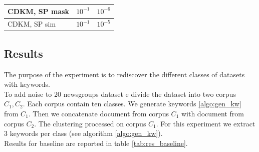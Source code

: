 \begin{table}
{\begin{tabular}{|l|l|l|}
       CDKM, SP mask  &$10^{-1}$  &$10^{-6}$         \\ \hline
       CDKM, SP sim   &$10^{-1}$  &$10^{-5}$         \\ \hline
\end{tabular}
}
\end{table}

\subsection{\label{seq:results}Results}
The purpose of the experiment is to rediscover the different classes of 
datasets with keywords.\\
To add noise to 20 newsgroups dataset e divide the dataset into two corpus $C_1, C_2$. 
Each corpus contain ten classes. We generate keywords \ref{algo:gen_kw} 
from $C_1$. Then we concatenate document from corpus $C_1$ with document
from corpus $C_2$. The clustering processed on corpus $C_1$. For this experiment
we extract 3 keywords per class (see algorithm \ref{algo:gen_kw}).
\\Results for baseline are reported in table \ref{tab:res_baseline}.

